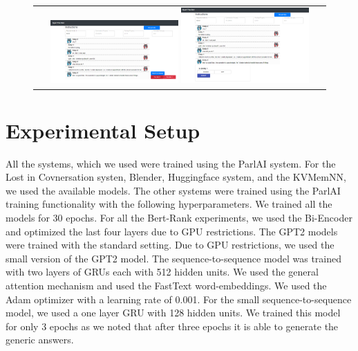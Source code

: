 \documentclass[11pt,a4paper]{article}
\begin{document}
\label{sec:appendix}
\begin{figure}[!ht]
	\begin{center}
        \begin{tabular}{@{}c@{}}
		\includegraphics[width=0.45\textwidth]{figures/GameAnnotationTool1.png} 
		\includegraphics[width=0.45\textwidth]{figures/GameAnnotationTool2.png}
       \end{tabular}
	\end{center}\vspace{-3mm}
\label{fig:game-tool}
\end{figure}

\section{Experimental Setup}
\label{app:experiments}
All the systems, which we used were trained using the ParlAI system. For the Lost in Covnersation systen, Blender, Huggingface system, and the KVMemNN, we used the available models. The other systems were trained using the ParlAI training functionality with the following hyperparameters. We trained all the models for 30 epochs.
For all the Bert-Rank experiments, we used the Bi-Encoder and optimized the last four layers due to GPU restrictions. 
The GPT2 models were trained with the standard setting. Due to GPU restrictions, we used the small version of the GPT2 model. 
The sequence-to-sequence model was trained with two layers of GRUs \cite{cho2014gru} each with 512 hidden units. We used the general attention mechanism \cite{luong-etal-2015-effective} and used the FastText word-embeddings\cite{bojanowski-etal-2017-enriching}. We used the Adam optimizer \cite{kingma2014adam} with a learning rate of 0.001. 
For the small sequence-to-sequence model, we used a one layer GRU with 128 hidden units. We trained this model for only 3 epochs as we noted that after three epochs it is able to generate the generic answers. 
\end{document}
